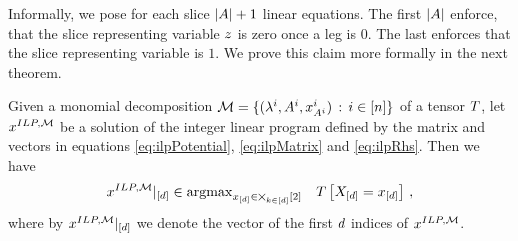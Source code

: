 Informally, we pose for each slice $\left|A\right|+1$ linear equations. 
The first $\left|A\right|$ enforce, that the slice representing variable $z$ is zero once a leg is $0$.
The last enforces that the slice representing variable is $1$. 
We prove this claim more formally in the next theorem.

\begin{theorem}
	Given a monomial decomposition $\mathcal{M}=\{(\lambda^{i}, A^{i}, x_{A^{i}}^{i}) \, : \, i\in[n]\}$ of a tensor $T$, let  $x^{ILP,\mathcal{M}}$ be a solution of the integer linear program defined by the matrix and vectors in equations \eqref{eq:ilpPotential}, \eqref{eq:ilpMatrix} and \eqref{eq:ilpRhs}.
	Then we have
		\[ {x^{ILP,\mathcal{M}}}|_{[d]} \in \mathrm{argmax}_{x_{[d]}\in\bigtimes_{k\in[d]}[2]} \quad T\left[X_{[d]}=x_{[d]}\right] \, ,\]
	where by  ${x^{ILP,\mathcal{M}}}|_{[d]}$ we denote the vector of the first $d$ indices of $x^{ILP,\mathcal{M}}$.
\end{theorem}
